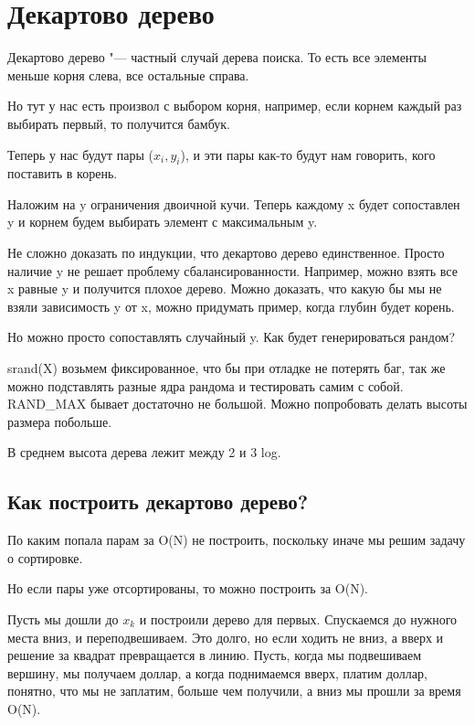 \section{Декартово дерево}

\begin{Def}
Декартово дерево "--- частный случай дерева поиска.
То есть все элементы меньше корня слева, все остальные справа.
\end{Def}

Но тут у нас есть произвол с выбором корня, например, если корнем каждый раз выбирать первый, то
получится бамбук.

Теперь у нас будут пары ($x_i, y_i$), и эти пары как-то будут нам говорить, кого поставить в корень.

Наложим на y ограничения двоичной кучи. Теперь каждому x будет сопоставлен y и корнем будем выбирать
элемент с максимальным y.

Не сложно доказать по индукции, что декартово дерево единственное.  Просто наличие y не решает проблему сбалансированности.
Например, можно взять все x равные y и получится плохое дерево. Можно доказать, что какую бы мы не взяли зависимость y от x, можно
придумать пример, когда глубин будет корень.

Но можно просто сопоставлять случайный y. Как будет генерироваться рандом?

srand(X) возьмем фиксированное, что бы при отладке не потерять баг, так же можно
подставлять разные ядра рандома и тестировать самим с собой. RAND\_MAX бывает достаточно не большой. Можно попробовать
делать высоты размера побольше.

В среднем высота дерева лежит между 2 и 3 log.

\subsection{Как построить декартово дерево?}

По каким попала парам за O(N) не построить, поскольку иначе мы решим задачу о сортировке.

Но если пары уже отсортированы, то можно построить за O(N).

Пусть мы дошли до $x_k$ и построили дерево для первых. Спускаемся до нужного места вниз, и переподвешиваем. Это долго, 
но если ходить не вниз, а вверх и решение за квадрат превращается в линию. Пусть, когда мы подвешиваем вершину, мы получаем доллар, 
а когда поднимаемся вверх, платим доллар, понятно, что мы не заплатим, больше чем получили, а вниз мы прошли за время O(N). 

